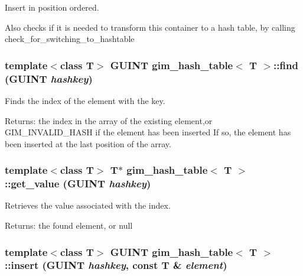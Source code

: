 Insert in position ordered. 

Also checks if it is needed to transform this container to a hash table, by calling check\_\-for\_\-switching\_\-to\_\-hashtable \hypertarget{classgim__hash__table_14261b2d7de34188f8bc5179e4d60760}{
\subsubsection[find]{\setlength{\rightskip}{0pt plus 5cm}template$<$class T$>$ GUINT {\bf gim\_\-hash\_\-table}$<$ T $>$::find (GUINT {\em hashkey})}}
\label{classgim__hash__table_14261b2d7de34188f8bc5179e4d60760}


Finds the index of the element with the key. 

\begin{Desc}
\item[Returns:]the index in the array of the existing element,or GIM\_\-INVALID\_\-HASH if the element has been inserted If so, the element has been inserted at the last position of the array. \end{Desc}
\hypertarget{classgim__hash__table_40b5c46a0117da3948cd1b093f185321}{
\subsubsection[get\_\-value]{\setlength{\rightskip}{0pt plus 5cm}template$<$class T$>$ T$\ast$ {\bf gim\_\-hash\_\-table}$<$ T $>$::get\_\-value (GUINT {\em hashkey})}}
\label{classgim__hash__table_40b5c46a0117da3948cd1b093f185321}


Retrieves the value associated with the index. 

\begin{Desc}
\item[Returns:]the found element, or null \end{Desc}
\hypertarget{classgim__hash__table_ff0e9bdb5bd6aacf9272db6789c514f7}{
\subsubsection[insert]{\setlength{\rightskip}{0pt plus 5cm}template$<$class T$>$ GUINT {\bf gim\_\-hash\_\-table}$<$ T $>$::insert (GUINT {\em hashkey}, \/  const T \& {\em element})}}
\label{classgim__hash__table_ff0e9bdb5bd6aacf9272db6789c514f7}


